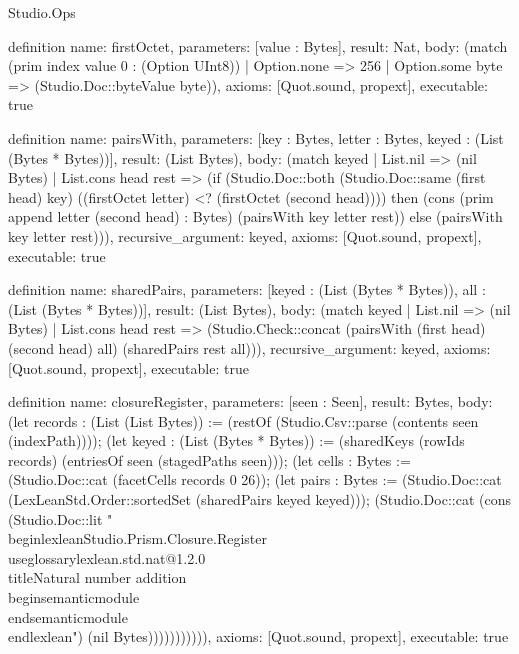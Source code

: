 \begin{lexlean}{Studio.Ops}
\begin{semanticmodule}
{definition{
  name: firstOctet,
  parameters: [value : Bytes],
  result: Nat,
  body: (match (prim index value 0 : (Option UInt8))
    | Option.none => 256
    | Option.some byte => (Studio.Doc::byteValue byte)),
  axioms: [Quot.sound, propext],
  executable: true
}

definition{
  name: pairsWith,
  parameters: [key : Bytes, letter : Bytes, keyed : (List (Bytes * Bytes))],
  result: (List Bytes),
  body: (match keyed
    | List.nil => (nil Bytes)
    | List.cons head rest => (if (Studio.Doc::both (Studio.Doc::same (first head) key) ((firstOctet letter) <? (firstOctet (second head)))) then (cons (prim append letter (second head) : Bytes) (pairsWith key letter rest)) else (pairsWith key letter rest))),
  recursive_argument: keyed,
  axioms: [Quot.sound, propext],
  executable: true
}

definition{
  name: sharedPairs,
  parameters: [keyed : (List (Bytes * Bytes)), all : (List (Bytes * Bytes))],
  result: (List Bytes),
  body: (match keyed
    | List.nil => (nil Bytes)
    | List.cons head rest => (Studio.Check::concat (pairsWith (first head) (second head) all) (sharedPairs rest all))),
  recursive_argument: keyed,
  axioms: [Quot.sound, propext],
  executable: true
}

definition{
  name: closureRegister,
  parameters: [seen : Seen],
  result: Bytes,
  body: (let records : (List (List Bytes)) := (restOf (Studio.Csv::parse (contents seen (indexPath)))); (let keyed : (List (Bytes * Bytes)) := (sharedKeys (rowIds records) (entriesOf seen (stagedPaths seen))); (let cells : Bytes := (Studio.Doc::cat (facetCells records 0 26)); (let pairs : Bytes := (Studio.Doc::cat (LexLeanStd.Order::sortedSet (sharedPairs keyed keyed))); (Studio.Doc::cat (cons (Studio.Doc::lit "\\begin{lexlean}{Studio.Prism.Closure.Register}\n\\useglossary{lexlean.std.nat@1.2.0}\n\\title{Natural number addition}\n\\begin{semanticmodule}\n{}\n\\end{semanticmodule}\n\\end{lexlean}\n") (nil Bytes))))))))))),
  axioms: [Quot.sound, propext],
  executable: true
}

}
\end{semanticmodule}
\end{lexlean}
